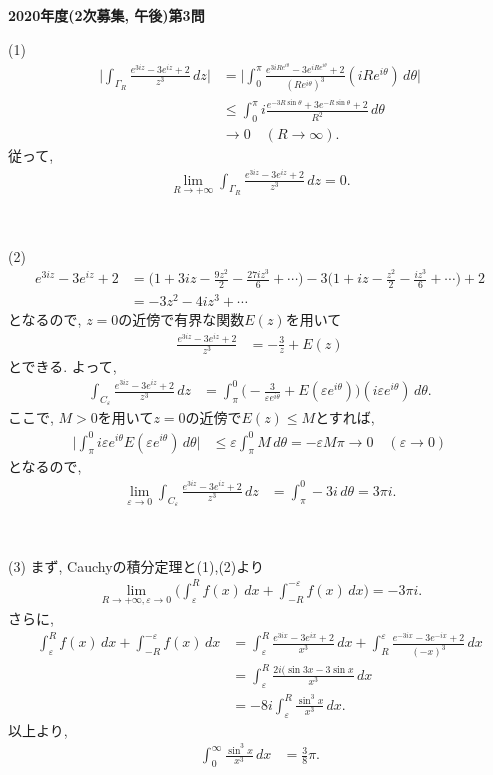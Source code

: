 ﻿\documentclass[a4paper,12pt]{jarticle}
\newcommand{\e}{\varepsilon}
\newcommand{\longra}{\longrightarrow}
\newcommand{\bl}{\biggl}
\newcommand{\br}{\biggr}
\newcommand{\nin}{\noindent}
\newcommand{\parnin}{\par\noindent}
\newcommand{\parr}{\par\ }
\begin{document}
\begin{center}
\bf{\LARGE 2020年度(2次募集, 午後)第3問}
\end{center}
\nin
(1)
  \begin{align*}
    \bl|\int_{\Gamma_R}\frac{e^{3iz}-3e^{iz}+2}{z^3}\,dz\br|
    &=\bl|\int_0^\pi 
    \frac{e^{3iRe^{i\theta}}-3e^{iRe^{i\theta}}+2}
    {(Re^{i\theta})^3}(iRe^{i\theta})\,d\theta\br| \\
    &\leq\int_0^\pi
    i\frac{e^{-3R\sin\theta}+3e^{-R\sin\theta}+2}{R^2}
    \,d\theta \\
    &\longra 0 \quad (R\to \infty).
  \end{align*}
  従って, 
  \begin{align*}
    \lim_{R\to+\infty}\int_{\Gamma_R}
    \frac{e^{3iz}-3e^{iz}+2}{z^3}\,dz=0.
  \end{align*}
\parr
\parnin
(2)
  \begin{align*}
    e^{3iz}-3e^{iz}+2
    &=\bl(1+3iz-\frac{9z^2}{2}-\frac{27iz^3}{6}+\cdots\br)
    -3\bl(1+iz-\frac{z^2}{2}-\frac{iz^3}{6}+\cdots\br)+2 \\
    &=-3z^2-4iz^3+\cdots
  \end{align*}
  となるので, $z=0$の近傍で有界な関数$E(z)$を用いて
  \begin{align*}
    \frac{e^{3iz}-3e^{iz}+2}{z^3}
    &=-\frac{3}{z}+E(z)
  \end{align*}
  とできる.
  よって, 
  \begin{align*}
    \int_{C_\e}\frac{e^{3iz}-3e^{iz}+2}{z^3}\,dz
    &=\int_\pi^0 
    \bl(-\frac{3}{\e e^{i\theta}}+E(\e e^{i\theta})\br)
    (i\e e^{i\theta})\,d\theta.
  \end{align*}
  ここで, $M>0$を用いて$z=0$の近傍で$E(z)\leq M$とすれば,
  \begin{align*}
    \bl|\int_\pi^0 i\e e^{i\theta}E(\e e^{i\theta})\,d\theta\br|
    &\leq \e\int_\pi^0 M\,d\theta
    =-\e M\pi
    \longra 0 \quad (\e\to 0)
  \end{align*}
  となるので, 
  \begin{align*}
    \lim_{\e\to 0}\int_{C_\e}\frac{e^{3iz}-3e^{iz}+2}{z^3}\,dz
    &=\int_\pi^0 -3i\,d\theta
    =3\pi i.
  \end{align*}
\parr
\parnin
(3)
  まず, Cauchyの積分定理と(1),(2)より
  \begin{align*}
    \lim_{R\to+\infty, \e\to 0}
    \bl(\int_\e^R f(x)\,dx+\int_{-R}^{-\e}f(x)\,dx\br)
    =-3\pi i.
  \end{align*}
  さらに, 
  \begin{align*}
    \int_\e^R f(x)\,dx+\int_{-R}^{-\e}f(x)\,dx
    &=\int_\e^R \frac{e^{3ix}-3e^{ix}+2}{x^3}\,dx
    +\int_{R}^{\e}\frac{e^{-3ix}-3e^{-ix}+2}{(-x)^3}\,dx \\
    &=\int_\e^R \frac{2i(\sin 3x-3\sin x}{x^3}\,dx \\
    &=-8i\int_\e^R \frac{\sin^3 x}{x^3}\,dx.
  \end{align*}
  以上より, 
  \begin{align*}
    \int_0^\infty \frac{\sin^3 x}{x^3}\,dx
    &=\frac{3}{8}\pi.
  \end{align*}
\end{document}
